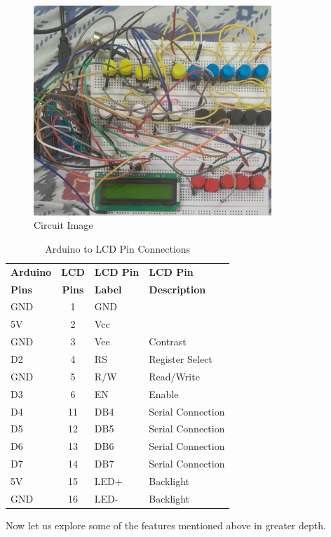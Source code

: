 \documentclass[a4paper,12pt]{article}
\begin{document}
  \begin{figure}
  \begin{center}
    \includegraphics[width=0.8\textwidth]{figs/circuit.jpeg}
  \end{center}
  \caption{Circuit Image}\label{fig:}
\end{figure}
\begin{table}[htbp]
    \centering
    \label{tab:arduino-lcd}
    \begin{tabular}{|l|c|l|l|}
        \hline
        \textbf{Arduino} & \textbf{LCD} & \textbf{LCD Pin} & \textbf{LCD Pin} \\
        \textbf{Pins} & \textbf{Pins} & \textbf{Label} & \textbf{Description} \\
        \hline
        GND & 1 & GND & \\
        \hline
        5V & 2 & Vcc & \\
        \hline
        GND & 3 & Vee & Contrast \\
        \hline
        D2 & 4 & RS & Register Select \\
        \hline
        GND & 5 & R/W & Read/Write \\
        \hline
        D3 & 6 & EN & Enable \\
        \hline
        D4 & 11 & DB4 & Serial Connection \\
        \hline
        D5 & 12 & DB5 & Serial Connection \\
        \hline
        D6 & 13 & DB6 & Serial Connection \\
        \hline
        D7 & 14 & DB7 & Serial Connection \\
        \hline
        5V & 15 & LED+ & Backlight \\
        \hline
        GND & 16 & LED- & Backlight \\
        \hline
    \end{tabular}
    \caption{Arduino to LCD Pin Connections}
\end{table}
Now let us explore some of the features mentioned above in greater depth.
\end{document}
